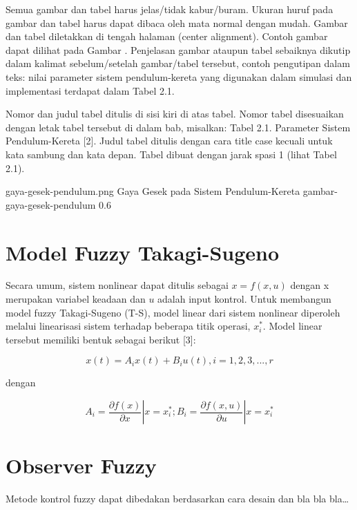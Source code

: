 Semua gambar dan tabel harus jelas/tidak kabur/buram. Ukuran huruf pada gambar dan tabel harus dapat dibaca oleh mata normal dengan mudah. Gambar dan tabel diletakkan di tengah halaman (center alignment). Contoh gambar dapat dilihat pada Gambar \label{gambar-gaya-gesek-pendulum}. Penjelasan gambar ataupun tabel sebaiknya dikutip dalam kalimat sebelum/setelah gambar/tabel tersebut, contoh pengutipan dalam teks: nilai parameter sistem pendulum-kereta yang digunakan dalam simulasi dan implementasi terdapat dalam Tabel 2.1.

Nomor dan judul tabel ditulis di sisi kiri di atas tabel. Nomor tabel disesuaikan dengan letak tabel tersebut di dalam bab, misalkan: Tabel 2.1. Parameter Sistem Pendulum-Kereta [2]. Judul tabel ditulis dengan cara title case kecuali untuk kata sambung dan kata depan. Tabel dibuat dengan jarak spasi 1 (lihat  Tabel 2.1).

\gambar
    {gaya-gesek-pendulum.png}
    {Gaya Gesek pada Sistem Pendulum-Kereta}
    {gambar-gaya-gesek-pendulum}
    {0.6}

\section{Model Fuzzy Takagi-Sugeno}

Secara umum, sistem nonlinear dapat ditulis sebagai $x = f(x,u)$  dengan x merupakan variabel keadaan dan $u$ adalah input kontrol. Untuk membangun model fuzzy Takagi-Sugeno (T-S), model linear dari sistem nonlinear diperoleh melalui linearisasi sistem terhadap beberapa titik operasi, $x_i^*$. Model linear tersebut memiliki bentuk sebagai berikut [3]:

\begin{equation}
x(t) = A_ix(t)+B_iu(t), i=1,2,3,...,r
\end{equation}

\noindent dengan

\begin{equation}
A_i = \left.\frac{\partial f(x)}{\partial x}\right|x=x_i^* ; B_i = \left.\frac{\partial f(x,u)}{\partial u}\right|x=x_i^*
\end{equation}

\section{Observer Fuzzy}

Metode kontrol fuzzy dapat dibedakan berdasarkan cara desain dan bla bla bla…